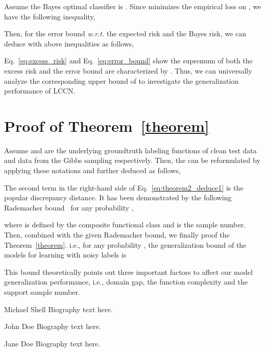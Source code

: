 \documentclass[journal]{IEEEtran}
\begin{document}
Assume the Bayes optimal classifier is . Since  minimizes the empirical loss on , we have the following inequality,

Then, for the error bound \textit{w.r.t.} the expected risk and the Bayes risk, we can deduce with above inequalities as follows,

Eq.~\eqref{eq:excess_risk} and Eq.~\eqref{eq:error_bound} show the supremum of both the excess risk and the error bound are characterized by . Thus, we can universally analyze the corresponding upper bound of  to investigate the generalization performance of LCCN.

\section{Proof of Theorem~\ref{theorem}}
Assume  and  are the underlying groundtruth labeling functions  of clean test data and data from the Gibbs sampling respectively. Then, the  can be reformulated by applying these notations and further deduced as follows,

The second term  in the right-hand side of Eq.~\eqref{eq:theorem2_deduce1} is the popular discrepancy distance. It has been demonstrated by the following Rademacher bound~\cite{mansour2009domain} for any probability ,

where  is defined by the composite functional class  and  is the sample number. Then, combined with the given Rademacher bound, we finally proof the Theorem~\ref{theorem}. i.e., for any probability , the generalization bound of the models for learning with noisy labels is 

This bound theoretically points out three important factors to affect our model generalization performance, i.e., domain gap, the function complexity and the support sample number.







\ifCLASSOPTIONcaptionsoff
  \newpage
\fi

















\begin{IEEEbiography}{Michael Shell}
Biography text here.
\end{IEEEbiography}

\begin{IEEEbiographynophoto}{John Doe}
Biography text here.
\end{IEEEbiographynophoto}



\begin{IEEEbiographynophoto}{Jane Doe}
Biography text here.
\end{IEEEbiographynophoto}
\end{document}

